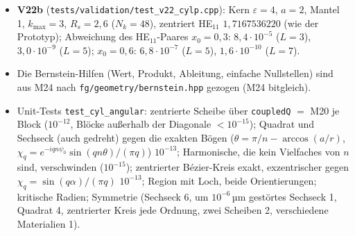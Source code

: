 \begin{itemize}[nosep]
        Verdopplung genügt die feste Regel: 16 und 32 Knoten stimmen für den exzentrischen Kern auf $2\cdot10^{-16}$
        überein (Unit-Test).
  \item \textbf{V22b} (\verb|tests/validation/test_v22_cylp.cpp|): Kern $\varepsilon=4$, $a=2$, Mantel 1, $k_{\max}=3$,
        $R_s=2{,}6$ ($N_k=48$), zentriert HE$_{11}$ $1{,}7167536220$ (wie der Prototyp); Abweichung des HE$_{11}$-Paares
        $x_0=0{,}3$: $8{,}4\cdot10^{-5}$ ($L=3$), $3{,}0\cdot10^{-9}$ ($L=5$); $x_0=0{,}6$: $6{,}8\cdot10^{-7}$ ($L=5$),
        $1{,}6\cdot10^{-10}$ ($L=7$).
  \item Die Bernstein-Hilfen (Wert, Produkt, Ableitung, einfache Nullstellen) sind aus M24 nach
        \verb|fg/geometry/bernstein.hpp| gezogen (M24 bitgleich).
  \item Unit-Tests \verb|test_cyl_angular|: zentrierte Scheibe über \verb|coupledQ| $=$ M20 je Block ($10^{-12}$,
        Blöcke außerhalb der Diagonale $<10^{-15}$); Quadrat und Sechseck (auch gedreht) gegen die exakten Bögen
        ($\theta=\pi/n-\arccos(a/r)$, $\chi_q=e^{-iqn\psi_0}\sin(qn\theta)/(\pi q)$) $10^{-13}$; Harmonische, die kein
        Vielfaches von $n$ sind, verschwinden ($10^{-15}$); zentrierter Bézier-Kreis exakt, exzentrischer gegen
        $\chi_q=\sin(q\alpha)/(\pi q)$ $10^{-13}$; Region mit Loch, beide Orientierungen; kritische Radien; Symmetrie
        (Sechseck 6, um $10^{-6}$\,µm gestörtes Sechseck 1, Quadrat 4, zentrierter Kreis jede Ordnung, zwei Scheiben 2,
        verschiedene Materialien 1).
\end{itemize}

